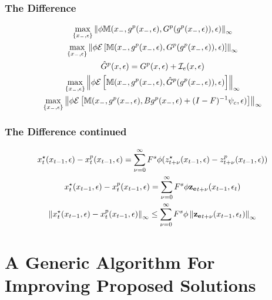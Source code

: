 \documentclass[tikz]{beamer}
\begin{document}
\begin{frame}
  \frametitle{The Difference}
{\small
  \begin{gather}
    \label{eq:3}
\max_{\{x_{-},\epsilon\}} \left\lVert \phi \mathbb{M}(x_{-},g^p(x_{-},\epsilon),G^p(g^p(x_{-},\epsilon)),\epsilon) \right\rVert_\infty\\
\max_{\{x_{-},\epsilon\}} \left\lVert \phi {\mathcal{E}\left [  \mathbb{M}(x_{-},g^p(x_{-},\epsilon),G^p(g^p(x_{-},\epsilon)),\epsilon) \right ]} \right\rVert_\infty\\
\hat{G}^p(x,\epsilon)=G^p(x,\epsilon)+ \mathcal{I}_e(x,\epsilon)\\
\max_{\{x_{-},\epsilon\}} \left\lVert \phi {\mathcal{E}\left [  \mathbb{M}(x_{-},g^p(x_{-},\epsilon),\hat{G}^p(g^p(x_{-},\epsilon)),\epsilon) \right ]} \right\rVert_\infty\\
\max_{\{x_{-},\epsilon\}} \left\lVert \phi {\mathcal{E}\left [  \mathbb{M}(x_{-},g^p(x_{-},\epsilon),B g^p(x_{-},\epsilon)+(I-F)^{-1}\psi_c,\epsilon) \right ]} \right\rVert_\infty
  \end{gather}
}
\end{frame}


\begin{frame}
  \frametitle{The Difference continued}
{\small
  \begin{gather}
    \label{eq:3}
	 x^\star_{t}(x_{t-1},\epsilon) -	 x^p_{t}(x_{t-1},\epsilon) =
\sum_{{\nu}=0}^\infty F^s \phi (z^\star_{t+{\nu}}(x_{t-1},\epsilon)-z^p_{t+{\nu}}(x_{t-1},\epsilon))     \\
	 x^\star_{t}(x_{t-1},\epsilon) -	 x^p_{t}(x_{t-1},\epsilon) =
\sum_{{\nu}=0}^\infty F^s \phi \mathbf{z_e}_{t+{\nu}}(x_{t-1},\epsilon_t)   \\ 
	\left\lVert x^\star_{t}(x_{t-1},\epsilon) -	 x^p_{t}(x_{t-1},\epsilon)\right\rVert_\infty \le
\sum_{{\nu}=0}^\infty F^s \phi \left\lVert\mathbf{z_e}_{t+{\nu}}(x_{t-1},\epsilon_t)\right\rVert_\infty    
  \end{gather}
}
\end{frame}

\section{A Generic Algorithm For Improving Proposed Solutions}
\end{document}
